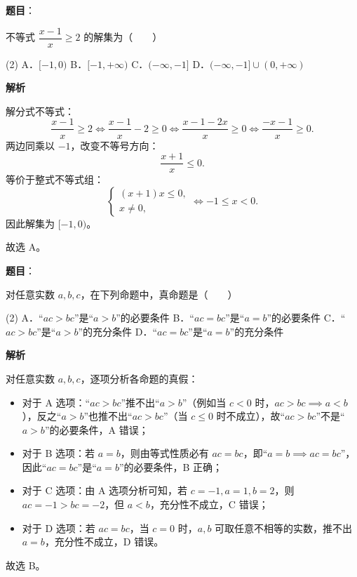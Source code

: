 \begin{answer}

\textbf{题目}：

不等式 $\dfrac{x-1}{x} \ge 2$ 的解集为\mbox{（　　）}

\begin{gkopts}(2)
\task A．$[-1, 0)$
\task B．$[-1, +\infty)$
\task C．$(-\infty, -1]$
\task D．$(-\infty, -1] \cup (0, +\infty)$
\end{gkopts}

\textbf{解析}

解分式不等式：
\nopagebreak[4]
\[
\dfrac{x-1}{x} \ge 2 \iff \dfrac{x-1}{x} - 2 \ge 0 \iff \dfrac{x-1-2x}{x} \ge 0 \iff \dfrac{-x-1}{x} \ge 0.
\]
两边同乘以 $-1$，改变不等号方向：
\nopagebreak[4]
\[
\dfrac{x+1}{x} \le 0.
\]
等价于整式不等式组：
\nopagebreak[4]
\[
\begin{cases}
(x+1)x \le 0, \\
x \neq 0,
\end{cases}
\iff -1 \le x < 0.
\]
因此解集为 $[-1, 0)$。

故选 A。


\end{answer}
\begin{answer}

\textbf{题目}：

对任意实数 $a, b, c$，在下列命题中，真命题是\mbox{（　　）}

\begin{gkopts}(2)
\task A．“$ac > bc$”是“$a > b$”的必要条件
\task B．“$ac = bc$”是“$a = b$”的必要条件
\task C．“$ac > bc$”是“$a > b$”的充分条件
\task D．“$ac = bc$”是“$a = b$”的充分条件
\end{gkopts}

\textbf{解析}

对任意实数 $a, b, c$，逐项分析各命题的真假：
\begin{itemize}
\item 对于 A 选项：“$ac > bc$”推不出“$a > b$”（例如当 $c < 0$ 时，$ac > bc \implies a < b$），反之“$a > b$”也推不出“$ac > bc$”（当 $c \le 0$ 时不成立），故“$ac > bc$”不是“$a > b$”的必要条件，A 错误；
\item 对于 B 选项：若 $a = b$，则由等式性质必有 $ac = bc$，即“$a = b \implies ac = bc$”，因此“$ac = bc$”是“$a = b$”的必要条件，B 正确；
\item 对于 C 选项：由 A 选项分析可知，若 $c = -1, a = 1, b = 2$，则 $ac = -1 > bc = -2$，但 $a < b$，充分性不成立，C 错误；
\item 对于 D 选项：若 $ac = bc$，当 $c = 0$ 时，$a, b$ 可取任意不相等的实数，推不出 $a = b$，充分性不成立，D 错误。
\end{itemize}

故选 B。


\end{answer}
